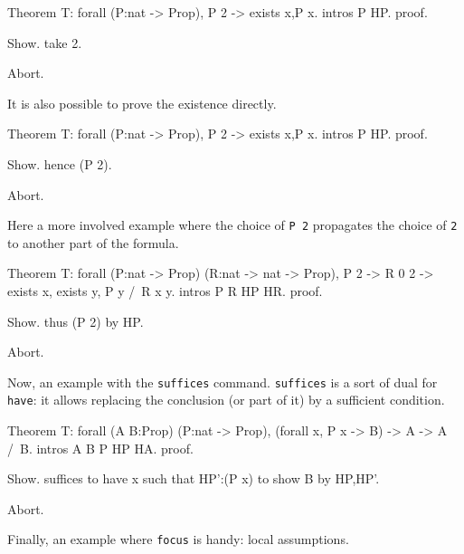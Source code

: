 \begin{coq_eval}
Theorem T: forall (P:nat -> Prop), P 2 -> exists x,P x.
intros P HP.
proof.
\end{coq_eval} 
\begin{coq_example}
Show.
take 2.
\end{coq_example}
\begin{coq_eval}
Abort.
\end{coq_eval}

It is also possible to prove the existence directly.

\begin{coq_eval}
Theorem T: forall (P:nat -> Prop), P 2 -> exists x,P x.
intros P HP.
proof.
\end{coq_eval} 
\begin{coq_example}
Show.
hence (P 2).
\end{coq_example}
\begin{coq_eval}
Abort.
\end{coq_eval}

Here a more involved example where the choice of {\tt P 2} propagates
the choice of {\tt 2} to another part of the formula.

\begin{coq_eval}
Theorem T: forall (P:nat -> Prop) (R:nat -> nat -> Prop), P 2 -> R 0 2 -> exists x, exists y, P y /\ R x y.
intros P R HP HR.
proof.
\end{coq_eval} 
\begin{coq_example}
Show.
thus (P 2) by HP.
\end{coq_example}
\begin{coq_eval}
Abort.
\end{coq_eval}

Now, an example with the {\tt suffices} command. {\tt suffices}
is a sort of dual for {\tt have}: it allows replacing the conclusion
(or part of it) by a sufficient condition. 

\begin{coq_eval}
Theorem T: forall (A B:Prop) (P:nat -> Prop), (forall x, P x -> B) -> A -> A /\ B.
intros A B P HP HA.
proof.
\end{coq_eval} 
\begin{coq_example}
Show.
suffices to have x such that HP':(P x) to show B by HP,HP'.
\end{coq_example}
\begin{coq_eval}
Abort.
\end{coq_eval}

Finally, an example where {\tt focus} is handy: local assumptions.

